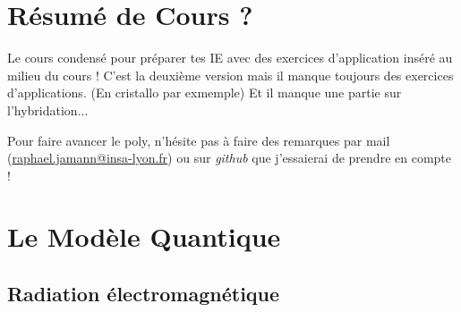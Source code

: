 \documentclass{article}
\title{\getTitle}
\author{Raphaël Jamann}
\date{Janvier 2025}
\begin{document}
\maketitle

\thispagestyle{empty}

\vspace{3cm}
\begin{figure}[h]
    \centering
\end{figure}

\section*{Résumé de Cours ?}
Le cours condensé pour préparer tes IE avec des exercices d'application inséré au milieu du cours !
C'est la deuxième version mais il manque toujours des exercices d'applications. (En cristallo par exmemple) Et il manque une partie sur l'hybridation...

Pour faire avancer le poly, n'hésite pas à faire des remarques par mail (\href{raphael.jamann@insa-lyon.fr}{raphael.jamann@insa-lyon.fr})
ou sur \textit{github} \href{https://github.com/RaphaJmnn/Cours-INSA-LYON}{\faGithub} que j'essaierai de prendre en compte !


\newpage

\tableofcontents


\newpage

\section{Le Modèle Quantique}
\subsection{Radiation électromagnétique}
\end{document}

